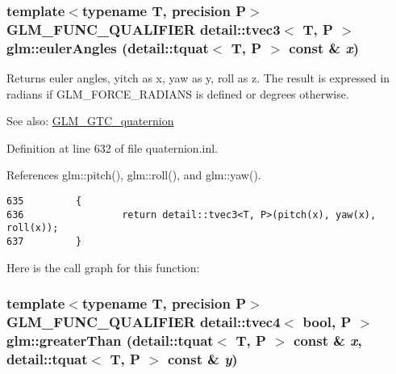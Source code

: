 \hypertarget{group__gtc__quaternion_gb7f90472a816598e7bc7b3606dbadcac}{
\subsubsection[eulerAngles]{\setlength{\rightskip}{0pt plus 5cm}template$<$typename T, precision P$>$ GLM\_\-FUNC\_\-QUALIFIER detail::tvec3$<$ T, P $>$ glm::eulerAngles (detail::tquat$<$ T, P $>$ const \& {\em x})}}
\label{group__gtc__quaternion_gb7f90472a816598e7bc7b3606dbadcac}


Returns euler angles, yitch as x, yaw as y, roll as z. The result is expressed in radians if GLM\_\-FORCE\_\-RADIANS is defined or degrees otherwise.

\begin{Desc}
\item[See also:]\hyperlink{group__gtc__quaternion}{GLM\_\-GTC\_\-quaternion} \end{Desc}


Definition at line 632 of file quaternion.inl.

References glm::pitch(), glm::roll(), and glm::yaw().

\begin{Code}\begin{verbatim}635         {
636                 return detail::tvec3<T, P>(pitch(x), yaw(x), roll(x));
637         }
\end{verbatim}
\end{Code}




Here is the call graph for this function:\hypertarget{group__gtc__quaternion_g1ee107eeb1b58dcc19bd56b119b7e14e}{
\subsubsection[greaterThan]{\setlength{\rightskip}{0pt plus 5cm}template$<$typename T, precision P$>$ GLM\_\-FUNC\_\-QUALIFIER detail::tvec4$<$ bool, P $>$ glm::greaterThan (detail::tquat$<$ T, P $>$ const \& {\em x}, \/  detail::tquat$<$ T, P $>$ const \& {\em y})}}
\label{group__gtc__quaternion_g1ee107eeb1b58dcc19bd56b119b7e14e}


